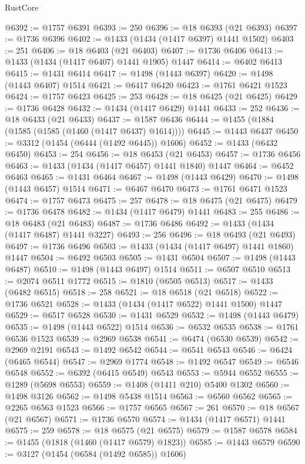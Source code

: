 \begin{lexlean}{RustCore}
\begin{coremodule}
@6392 := @1757 @6391
@6393 := 250
@6396 := @18 @6393 (@21 @6393)
@6397 := @1736 @6396
@6402 := @1433 (@1434 (@1417 @6397) @1441 @1502)
@6403 := 251
@6406 := @18 @6403 (@21 @6403)
@6407 := @1736 @6406
@6413 := @1433 (@1434 (@1417 @6407) @1441 @1905) @1447
@6414 := @6402 @6413
@6415 := @1431 @6414
@6417 := @1498 (@1443 @6397)
@6420 := @1498 (@1443 @6407) @1514
@6421 := @6417 @6420
@6423 := @1761 @6421 @1523
@6424 := @1757 @6423
@6425 := 253
@6428 := @18 @6425 (@21 @6425)
@6429 := @1736 @6428
@6432 := @1434 (@1417 @6429) @1441
@6433 := 252
@6436 := @18 @6433 (@21 @6433)
@6437 := @1587 @6436
@6444 := @1455 (@1884 (@1585 (@1585 (@1460 (@1417 @6437) @1614))))
@6445 := @1443 @6437
@6450 := @3312 (@1454 (@6444 (@1492 @6445)) @1606)
@6452 := @1433 (@6432 @6450)
@6453 := 254
@6456 := @18 @6453 (@21 @6453)
@6457 := @1736 @6456
@6463 := @1433 (@1434 (@1417 @6457) @1441 @1840) @1447
@6464 := @6452 @6463
@6465 := @1431 @6464
@6467 := @1498 (@1443 @6429)
@6470 := @1498 (@1443 @6457) @1514
@6471 := @6467 @6470
@6473 := @1761 @6471 @1523
@6474 := @1757 @6473
@6475 := 257
@6478 := @18 @6475 (@21 @6475)
@6479 := @1736 @6478
@6482 := @1434 (@1417 @6479) @1441
@6483 := 255
@6486 := @18 @6483 (@21 @6483)
@6487 := @1736 @6486
@6492 := @1433 (@1434 (@1417 @6487) @1441 @3227)
@6493 := 256
@6496 := @18 @6493 (@21 @6493)
@6497 := @1736 @6496
@6503 := @1433 (@1434 (@1417 @6497) @1441 @1860) @1447
@6504 := @6492 @6503
@6505 := @1431 @6504
@6507 := @1498 (@1443 @6487)
@6510 := @1498 (@1443 @6497) @1514
@6511 := @6507 @6510
@6513 := @2074 @6511 @1772
@6515 := @1810 (@6505 @6513)
@6517 := @1433 (@6482 @6515)
@6518 := 258
@6521 := @18 @6518 (@21 @6518)
@6522 := @1736 @6521
@6528 := @1433 (@1434 (@1417 @6522) @1441 @1500) @1447
@6529 := @6517 @6528
@6530 := @1431 @6529
@6532 := @1498 (@1443 @6479)
@6535 := @1498 (@1443 @6522) @1514
@6536 := @6532 @6535
@6538 := @1761 @6536 @1523
@6539 := @2969 @6538
@6541 := @6474 (@6530 @6539)
@6542 := @2969 @2191
@6543 := @1492 @6542
@6544 := @6541 @6543
@6546 := @6424 (@6465 @6544)
@6547 := @2969 @1774
@6548 := @1492 @6547
@6549 := @6546 @6548
@6552 := @6392 (@6415 @6549) @6543
@6553 := @5944 @6552
@6555 := @1289 (@5698 @6553)
@6559 := @1408 (@1411 @210) @5400 @1302
@6560 := @1498 @3126
@6562 := @1498 @5438 @1514
@6563 := @6560 @6562
@6565 := @2265 @6563 @1523
@6566 := @1757 @6565
@6567 := 261
@6570 := @18 @6567 (@21 @6567)
@6571 := @1736 @6570
@6574 := @1434 (@1417 @6571) @1441
@6575 := 259
@6578 := @18 @6575 (@21 @6575)
@6579 := @1587 @6578
@6584 := @1455 (@1818 (@1460 (@1417 @6579) @1823))
@6585 := @1443 @6579
@6590 := @3127 (@1454 (@6584 (@1492 @6585)) @1606)

\end{coremodule}
\end{lexlean}
